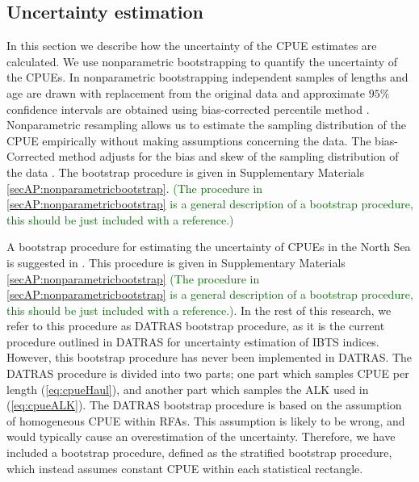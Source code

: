 \documentclass[a4paper 12pt]{article}
\numberwithin{equation}{section}
\newcommand{\olav}[1]{\textcolor{darkgreen}{#1}}
\begin{document}
\subsection{Uncertainty estimation}
\label{sec:uncertaintyestimation}
In this section we describe how the uncertainty of the CPUE estimates are calculated. We use nonparametric bootstrapping to quantify the uncertainty of the CPUEs. In nonparametric bootstrapping independent samples of lengths and age are drawn with replacement from the original data and approximate $95\%$ confidence intervals are obtained using bias-corrected percentile method  \citep{carpenter2000bootstrap}. Nonparametric resampling allows us to estimate the sampling distribution of the CPUE empirically without making assumptions concerning the data. The bias-Corrected method adjusts for the bias and skew of the sampling distribution of the data \citep{puth2015variety, karlsson2009bootstrap}. The bootstrap procedure is given in Supplementary Materials \ref{secAP:nonparametricbootstrap}.  \olav{(The procedure in \ref{secAP:nonparametricbootstrap} is a general description of a bootstrap procedure, this should  be just included with a reference.)}

A bootstrap procedure for estimating the uncertainty of CPUEs in the North Sea is suggested in \citet{ICES2006Report}. This procedure is given in Supplementary Materials \ref{secAP:nonparametricbootstrap} \olav{(The procedure in \ref{secAP:nonparametricbootstrap} is a general description of a bootstrap procedure, this should  be just included with a reference.)}. In the rest of this research, we refer to this procedure as DATRAS bootstrap procedure, as it is the current procedure outlined in DATRAS for uncertainty estimation of IBTS indices. However, this bootstrap procedure has never been implemented in DATRAS. The DATRAS procedure is divided into two parts; one part which samples CPUE per length (\ref{eq:cpueHaul}), and another part which samples the ALK used in (\ref{eq:cpueALK}). The DATRAS bootstrap procedure is based on the assumption of homogeneous CPUE within RFAs. This assumption is likely to be wrong, and would typically cause an overestimation of the uncertainty.  Therefore, we have included a bootstrap procedure, defined as the stratified bootstrap procedure, which instead assumes constant CPUE within each statistical rectangle. 
\end{document}
